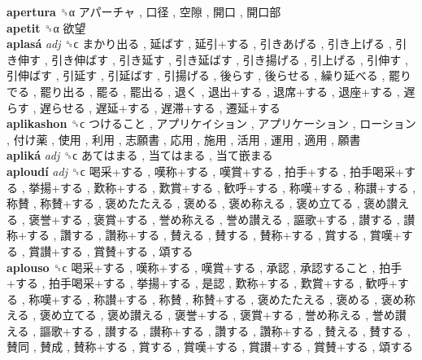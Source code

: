 \textbf{apertura} ␝α   アパーチャ ,  口径 ,  空隙 ,  開口 ,  開口部   \\
\textbf{apetit} ␝α   欲望   \\
\textbf{aplasá} \emph{adj}  ␝ϲ   まかり出る ,  延ばす ,  延引+する ,  引きあげる ,  引き上げる ,  引き伸す ,  引き伸ばす ,  引き延す ,  引き延ばす ,  引き揚げる ,  引上げる ,  引伸す ,  引伸ばす ,  引延す ,  引延ばす ,  引揚げる ,  後らす ,  後らせる ,  繰り延べる ,  罷りでる ,  罷り出る ,  罷る ,  罷出る ,  退く ,  退出+する ,  退席+する ,  退座+する ,  遅らす ,  遅らせる ,  遅延+する ,  遅滞+する ,  遷延+する   \\
\textbf{aplikashon} ␝ϲ   つけること ,  アプリケイション ,  アプリケーション ,  ローション ,  付け薬 ,  使用 ,  利用 ,  志願書 ,  応用 ,  施用 ,  活用 ,  運用 ,  適用 ,  願書   \\
\textbf{apliká} \emph{adj}  ␝ϲ   あてはまる ,  当てはまる ,  当て嵌まる   \\
\textbf{aploudí} \emph{adj}  ␝ϲ   喝采+する ,  嘆称+する ,  嘆賞+する ,  拍手+する ,  拍手喝采+する ,  挙揚+する ,  歎称+する ,  歎賞+する ,  歓呼+する ,  称嘆+する ,  称讃+する ,  称賛 ,  称賛+する ,  褒めたたえる ,  褒める ,  褒め称える ,  褒め立てる ,  褒め讃える ,  褒誉+する ,  褒賞+する ,  誉め称える ,  誉め讃える ,  謳歌+する ,  讃する ,  讃称+する ,  讚する ,  讚称+する ,  賛える ,  賛する ,  賛称+する ,  賞する ,  賞嘆+する ,  賞讃+する ,  賞賛+する ,  頌する   \\
\textbf{aplouso} ␝ϲ   喝采+する ,  嘆称+する ,  嘆賞+する ,  承認 ,  承認すること ,  拍手+する ,  拍手喝采+する ,  挙揚+する ,  是認 ,  歎称+する ,  歎賞+する ,  歓呼+する ,  称嘆+する ,  称讃+する ,  称賛 ,  称賛+する ,  褒めたたえる ,  褒める ,  褒め称える ,  褒め立てる ,  褒め讃える ,  褒誉+する ,  褒賞+する ,  誉め称える ,  誉め讃える ,  謳歌+する ,  讃する ,  讃称+する ,  讚する ,  讚称+する ,  賛える ,  賛する ,  賛同 ,  賛成 ,  賛称+する ,  賞する ,  賞嘆+する ,  賞讃+する ,  賞賛+する ,  頌する   \\
